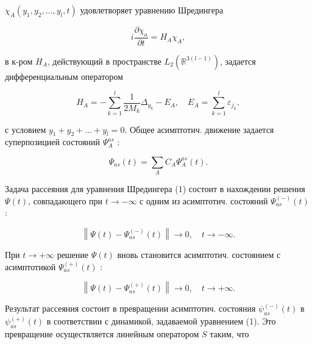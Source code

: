 \documentclass[10pt]{article}
\begin{document}
$\chi_{A}\left(y_{1}, y_{2}, \ldots, y_{l}, t\right)$ удовлетворяет уравнению Шредингера



\[

i \frac{\partial \chi_{a}}{\partial t}=H_{A} \chi_{A},

\]



в к-ром $H_{A}$, действующий в пространстве $L_{2}\left(\mathbb{R}^{3(l-1)}\right)$, задается дифференциальным оператором



\[

H_{A}=-\sum_{k=1}^{l} \frac{1}{2 M_{k}} \Delta_{y_{k}}-E_{A}, \quad E_{A}=\sum_{k=1}^{l} \varepsilon_{j_{k}},

\]



с условием $y_{1}+y_{2}+\ldots+y_{l}=0$. Общее асимптотич. движение задается суперпозицией состояний $\Psi_{A}^{a s}$ :



\[

\Psi_{a s}(t)=\sum_{A} C_{A} \Psi_{A}^{a s}(t) .

\]



Задача рассеяния для уравнения Шредингера (1) состоит в нахождении решения $\Psi(t)$, совпадающего при $t \rightarrow-\infty$ с одним из асимптотич. состояний $\Psi_{a s}^{(-)}(t)$ :



\[

\left\|\Psi(t)-\Psi_{a s}^{(-)}(t)\right\| \rightarrow 0, \quad t \rightarrow-\infty .

\]



При $t \rightarrow+\infty$ решение $\Psi(t)$ вновь становится асимптотич. состоянием с асимптотикой $\Psi_{a s}^{(+)}(t)$ :



\[

\left\|\Psi(t)-\Psi_{a s}^{(+)}(t)\right\| \rightarrow 0, \quad t \rightarrow+\infty .

\]



Результат рассеяния состоит в превращении асимптотич. состояния $\psi_{a s}^{(-)}(t)$ в $\psi_{a s}^{(+)}(t)$ в соответствии с динамикой, задаваемой уравнением (1). Это превращение осуществляется линейным оператором $S$ таким, что
\end{document}
